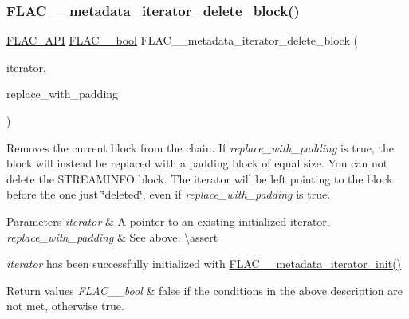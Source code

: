 \subsubsection{\texorpdfstring{FLAC\_\_metadata\_iterator\_delete\_block()}{FLAC\_\_metadata\_iterator\_delete\_block()}}
{\footnotesize\ttfamily \mbox{\hyperlink{group__flac__export_ga56ca07df8a23310707732b1c0007d6f5}{F\+L\+A\+C\+\_\+\+A\+PI}} \mbox{\hyperlink{ordinals_8h_a95103469f1cbd78b8cf250194985b34e}{F\+L\+A\+C\+\_\+\+\_\+bool}} F\+L\+A\+C\+\_\+\+\_\+metadata\+\_\+iterator\+\_\+delete\+\_\+block (\begin{DoxyParamCaption}\item[{\mbox{\hyperlink{group__flac__metadata__level2_ga9f3e135a07cdef7e51597646aa7b89b2}{F\+L\+A\+C\+\_\+\+\_\+\+Metadata\+\_\+\+Iterator}} $\ast$}]{iterator,  }\item[{\mbox{\hyperlink{ordinals_8h_a95103469f1cbd78b8cf250194985b34e}{F\+L\+A\+C\+\_\+\+\_\+bool}}}]{replace\+\_\+with\+\_\+padding }\end{DoxyParamCaption})}

Removes the current block from the chain. If {\itshape replace\+\_\+with\+\_\+padding} is {\ttfamily true}, the block will instead be replaced with a padding block of equal size. You can not delete the S\+T\+R\+E\+A\+M\+I\+N\+FO block. The iterator will be left pointing to the block before the one just \char`\"{}deleted\char`\"{}, even if {\itshape replace\+\_\+with\+\_\+padding} is {\ttfamily true}.


\begin{DoxyParams}{Parameters}
{\em iterator} & A pointer to an existing initialized iterator. \\
\hline
{\em replace\+\_\+with\+\_\+padding} & See above. \textbackslash{}assert 
\begin{DoxyCode}{1}
\end{DoxyCode}
 {\itshape iterator} has been successfully initialized with \mbox{\hyperlink{group__flac__metadata__level2_ga4a5af69a1f19436b02f738eb8c97c959}{F\+L\+A\+C\+\_\+\+\_\+metadata\+\_\+iterator\+\_\+init()}} \\
\hline
\end{DoxyParams}

\begin{DoxyRetVals}{Return values}
{\em F\+L\+A\+C\+\_\+\+\_\+bool} & {\ttfamily false} if the conditions in the above description are not met, otherwise {\ttfamily true}. \\
\hline
\end{DoxyRetVals}
\mbox{\label{group__flac__metadata__level2_ga4a2b00a4312d178a9f55c2e2f8b08904}} 

